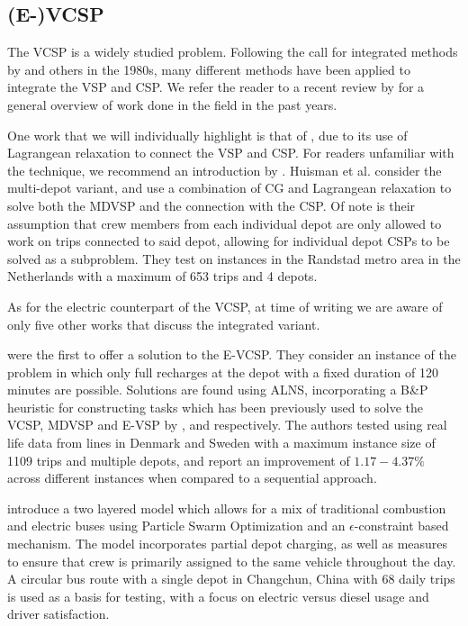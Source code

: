 \documentclass[]{article}
\begin{document}
\subsection{(E-)VCSP} \label{sec:evcsp-litrev}
The VCSP is a widely studied problem. Following the call for integrated methods by \citet{Bodin1983} and others in the 1980s, many different methods have been applied to integrate the VSP and CSP. We refer the reader to a recent review by \citet{Ge2024} for a general overview of work done in the field in the past years.

One work that we will individually highlight is that of \citet{Huisman2005}, due to its use of Lagrangean relaxation to connect the VSP and CSP. For readers unfamiliar with the technique, we recommend an introduction by \citet{Beasley1993}. Huisman et al. consider the multi-depot variant, and use a combination of CG and Lagrangean relaxation to solve both the MDVSP and the connection with the CSP. Of note is their assumption that crew members from each individual depot are only allowed to work on trips connected to said depot, allowing for individual depot CSPs to be solved as a subproblem. They test on instances in the Randstad metro area in the Netherlands with a maximum of 653 trips and 4 depots.


As for the electric counterpart of the VCSP, at time of writing we are aware of only five other works that discuss the integrated variant.

\citet{Perumal2021} were the first to offer a solution to the E-VCSP. They consider an instance of the problem in which only full recharges at the depot with a fixed duration of 120 minutes are possible. Solutions are found using ALNS, incorporating a B\&P heuristic for constructing tasks which has been previously used to solve the VCSP, MDVSP and E-VSP by \citet{Haase1996}, \citet{Pepin2009} and
\citet{ vanKootenNiekerk2017} respectively. The authors tested using real life data from lines in Denmark and Sweden with a
maximum instance size of 1109 trips and multiple depots, and report an improvement of $1.17-4.37\%$
across different instances when compared to a sequential approach.

\citet{Wang2022} introduce a two layered model which allows for a mix of traditional combustion and electric buses using Particle Swarm Optimization and an $\epsilon$-constraint based mechanism. The model incorporates partial depot charging, as well as measures to ensure that crew is primarily assigned to the same vehicle throughout the day. A circular bus route with a single depot in Changchun, China with 68 daily trips is used as a basis for testing, with a focus on electric versus diesel usage and driver satisfaction.
\end{document}

